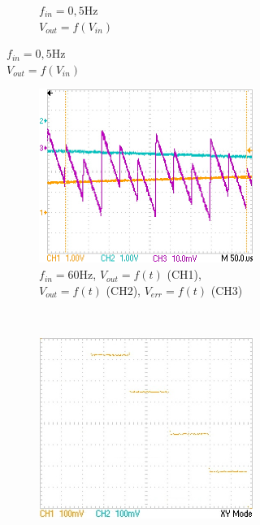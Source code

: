 \documentclass{article}
\begin{document}
\begin{figure}
\begin{subfigure}[b]{0.3\textwidth}
\begin{subfigure}[b]{\textwidth}
			\caption{\centering $f_{in}=\mathrm{0,5 Hz}$\\$V_{out}=f(V_{in})$}
			\label{fig:slowXY}
		\end{subfigure}
	\end{subfigure}
	\hfill
	\begin{subfigure}[b]{0.3\textwidth}
		\begin{subfigure}[b]{\textwidth}
			\centering
			\includegraphics[width=\textwidth]{data/TEK0008_}
			\caption{\centering $f_{in}=\mathrm{60 Hz}$, $V_{out}=f(t)$ (CH1),\\ $V_{out}=f(t)$ (CH2), $V_{err}=f(t)$ (CH3)}
			\label{fig:ech1}
		\end{subfigure}
		\\
		\begin{subfigure}[b]{\textwidth}
			\centering
			\includegraphics[width=\textwidth]{data/TEK0020_}

\end{subfigure}
\end{subfigure}
\end{figure}
\end{document}
